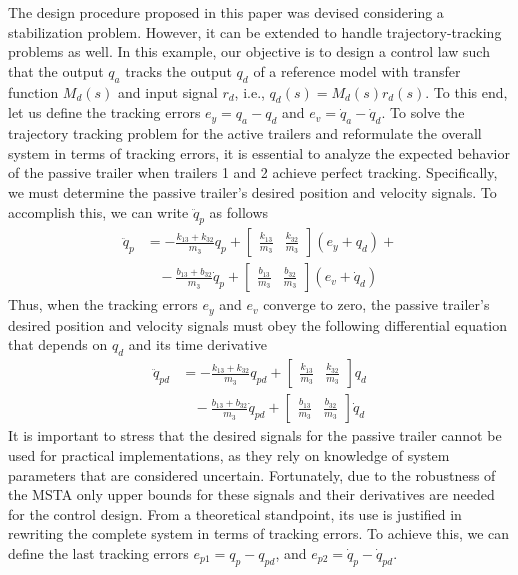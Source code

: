 \documentclass[twocolumn]{autarc_LH}
\begin{document}
The design procedure proposed in this paper was devised considering a stabilization problem. However, it can be extended to handle trajectory-tracking problems as well. In this example, our objective is to design a control law such that the output $q_a$ tracks the output $q_d$ of a reference model with transfer function $M_d(s)$ and input signal $r_d$, i.e., $q_d(s) = M_d(s) r_d(s)$. To this end, let us define the tracking errors $e_{y}  = q_{a} - q_{d}$ and $e_{v}  = \dot{q}_a - \dot{q}_d$.
To solve the trajectory tracking problem for the active trailers and reformulate the overall system in terms of tracking errors, it is essential to analyze the expected behavior of the passive trailer when trailers 1 and 2 achieve perfect tracking. Specifically, we must determine the passive trailer's desired position and velocity signals. To accomplish this, we can write $\ddot{q}_p$ as follows
\begin{align}
    \label{eq:passive_trailer}
    \ddot{q}_{p} & = -\frac{k_{13}+k_{32}}{m_3} q_{p} + \left[ \begin{array}{cc}
        \frac{k_{13}}{m_3}  & \frac{k_{32}}{m_3} \end{array} \right] (e_y + q_d) + \nonumber \\ & ~~~~-\frac{b_{13}+b_{32}}{m_3} \dot{q}_p + \left[ \begin{array}{cc}
        \frac{b_{13}}{m_3}  & \frac{b_{32}}{m_3} \end{array} \right] (e_v + \dot{q}_d)
\end{align}
Thus, when the tracking errors $e_y$ and $e_v$ converge to zero, the passive trailer's desired position and velocity signals must obey the following differential equation that depends on $q_d$ and its time derivative 
\begin{align*}
    \ddot{q}_{pd} & = -\frac{k_{13}+k_{32}}{m_3} q_{pd} + \left[ \begin{array}{cc}
        \frac{k_{13}}{m_3}  & \frac{k_{32}}{m_3} \end{array} \right] q_d \nonumber \\ & ~~~~-\frac{b_{13}+b_{32}}{m_3} \dot{q}_{pd} + \left[ \begin{array}{cc}
        \frac{b_{13}}{m_3}  & \frac{b_{32}}{m_3} \end{array} \right] \dot{q}_d
\end{align*}
It is important to stress that the desired signals for the passive trailer cannot be used for practical implementations, as they rely on knowledge of system parameters that are considered uncertain. Fortunately, due to the robustness of the MSTA only upper bounds for these signals and their derivatives are needed for the control design. From a theoretical standpoint, its use is justified in rewriting the complete system in terms of tracking errors. To achieve this, we can define the last tracking errors $e_{p1} = q_p - q_{pd}$, and $e_{p2} = \dot{q}_{p} - \dot{q}_{pd}$.
\end{document}
